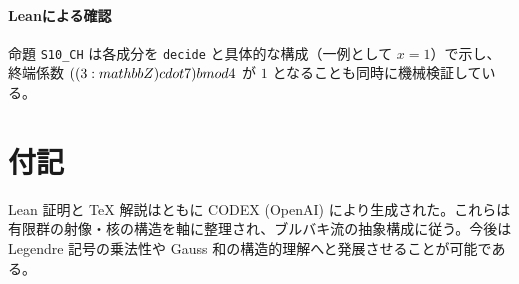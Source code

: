 \documentclass{ltjsarticle}
\theoremstyle{definition}
\begin{document}
\paragraph{Leanによる確認} 命題 \verb|S10_CH| は各成分を \verb|decide| と具体的な構成（一例として $x=1$）で示し、終端係数 $((3 : \\mathbb{Z})\\cdot 7) \\bmod 4$ が $1$ となることも同時に機械検証している。

\section{付記}
Lean 証明と TeX 解説はともに CODEX (OpenAI) により生成された。これらは有限群の射像・核の構造を軸に整理され、ブルバキ流の抽象構成に従う。今後は Legendre 記号の乗法性や Gauss 和の構造的理解へと発展させることが可能である。
\end{document}
